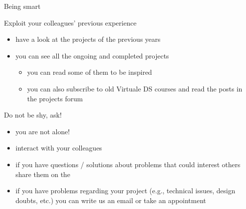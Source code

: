 \documentclass[presentation]{beamer}\mode<presentation>{\usetheme{AMSBolognaFC}}
\begin{document}
    
\begin{frame}[c,allowframebreaks]{Being smart}
    \begin{block}{Exploit your colleagues' previous experience}
        \begin{itemize}
            \item have a look at the projects of the previous years
            \item {} you can see all the ongoing and completed projects
            \begin{itemize}
                \item you can read some of them to be inspired
                \item you can also subscribe to old Virtuale DS courses and read the posts in the projects forum
            \end{itemize}
        \end{itemize}
    \end{block}
    
    \framebreak
    
    \begin{block}{Do not be shy, ask!}
        \begin{itemize}
            \item you are not alone!
            \item interact with your colleagues
            \item if you have questions / solutions about problems that could interest others share them on the 
            \item if you have problems regarding your project (e.g., technical issues, design doubts, etc.) you can write us an email or take an appointment
        \end{itemize}
    \end{block}
\end{frame}
\end{document}
